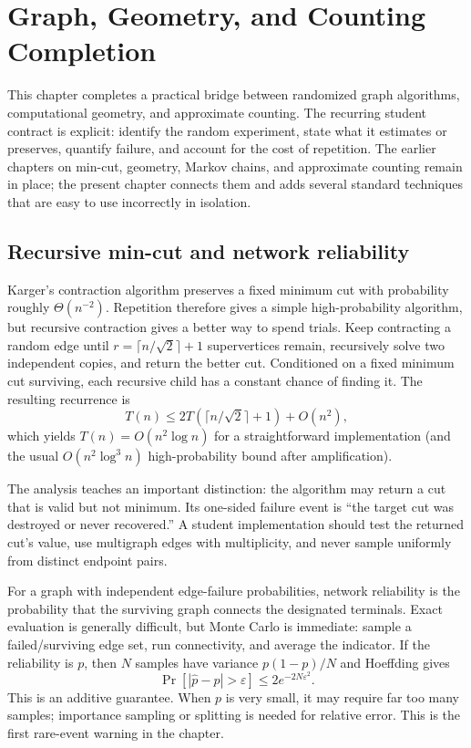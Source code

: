 \chapter{Graph, Geometry, and Counting Completion}
\label{ch:stage7-graph-geometry-counting}

This chapter completes a practical bridge between randomized graph algorithms,
computational geometry, and approximate counting.  The recurring student
contract is explicit: identify the random experiment, state what it estimates
or preserves, quantify failure, and account for the cost of repetition.  The
earlier chapters on min-cut, geometry, Markov chains, and approximate counting
remain in place; the present chapter connects them and adds several standard
techniques that are easy to use incorrectly in isolation.

\section{Recursive min-cut and network reliability}

Karger's contraction algorithm preserves a fixed minimum cut with probability
roughly $\Theta(n^{-2})$.  Repetition therefore gives a simple high-probability
algorithm, but recursive contraction gives a better way to spend trials.  Keep
contracting a random edge until $r=\lceil n/\sqrt{2}\rceil+1$ supervertices
remain, recursively solve two independent copies, and return the better cut.
Conditioned on a fixed minimum cut surviving, each recursive child has a
constant chance of finding it.  The resulting recurrence is
\[
 T(n) \leq 2T(\lceil n/\sqrt{2}\rceil+1)+O(n^2),
\]
which yields $T(n)=O(n^2\log n)$ for a straightforward implementation (and
the usual $O(n^2\log^3 n)$ high-probability bound after amplification).

The analysis teaches an important distinction: the algorithm may return a cut
that is valid but not minimum.  Its one-sided failure event is ``the target
cut was destroyed or never recovered.''  A student implementation should
test the returned cut's value, use multigraph edges with multiplicity, and
never sample uniformly from distinct endpoint pairs.

For a graph with independent edge-failure probabilities, network reliability
is the probability that the surviving graph connects the designated terminals.
Exact evaluation is generally difficult, but Monte Carlo is immediate:
sample a failed/surviving edge set, run connectivity, and average the indicator.
If the reliability is $p$, then $N$ samples have variance $p(1-p)/N$ and
Hoeffding gives
\[
 \Pr[|\widehat p-p|>\varepsilon]\leq 2e^{-2N\varepsilon^2}.
\]
This is an additive guarantee.  When $p$ is very small, it may require far
too many samples; importance sampling or splitting is needed for relative
error.  This is the first rare-event warning in the chapter.

